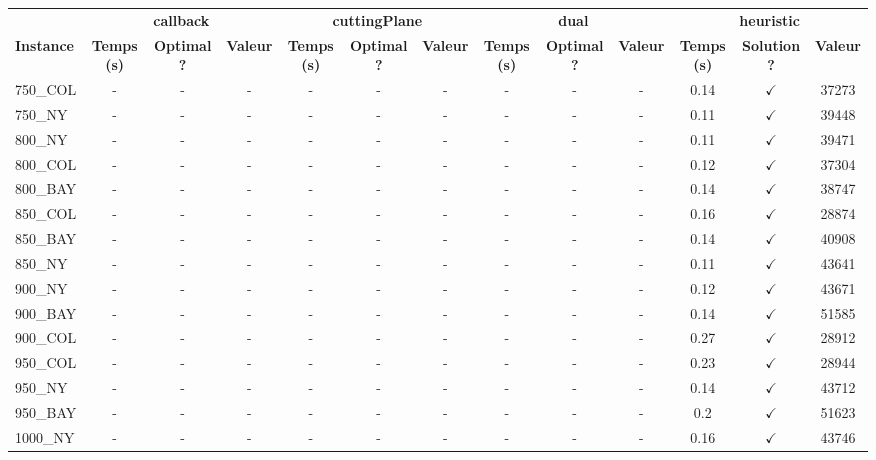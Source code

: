 \documentclass[main.tex]{subfiles}
\begin{document}
\begin{landscape}
\begin{center}
\renewcommand{\arraystretch}{1.4} 
 \begin{tabular}{lcccccccccccc}
	\hline
 & \multicolumn{3}{c}{\textbf{callback}} & \multicolumn{3}{c}{\textbf{cuttingPlane}} & \multicolumn{3}{c}{\textbf{dual}} & \multicolumn{3}{c}{\textbf{heuristic}}\\
\textbf{Instance}  & \textbf{Temps (s)} & \textbf{Optimal ?} & \textbf{Valeur} & \textbf{Temps (s)} & \textbf{Optimal ?} & \textbf{Valeur} & \textbf{Temps (s)} & \textbf{Optimal ?} & \textbf{Valeur} & \textbf{Temps (s)} & \textbf{Solution ?} & \textbf{Valeur}\\\hline

750\_COL & - & - & - 
 & - & - & - 
 & - & - & - 
 & 0.14 & $\checkmark$ & 37273\\
750\_NY & - & - & - 
 & - & - & - 
 & - & - & - 
 & 0.11 & $\checkmark$ & 39448\\
800\_NY & - & - & - 
 & - & - & - 
 & - & - & - 
 & 0.11 & $\checkmark$ & 39471\\
800\_COL & - & - & - 
 & - & - & - 
 & - & - & - 
 & 0.12 & $\checkmark$ & 37304\\
800\_BAY & - & - & - 
 & - & - & - 
 & - & - & - 
 & 0.14 & $\checkmark$ & 38747\\
850\_COL & - & - & - 
 & - & - & - 
 & - & - & - 
 & 0.16 & $\checkmark$ & 28874\\
850\_BAY & - & - & - 
 & - & - & - 
 & - & - & - 
 & 0.14 & $\checkmark$ & 40908\\
850\_NY & - & - & - 
 & - & - & - 
 & - & - & - 
 & 0.11 & $\checkmark$ & 43641\\
900\_NY & - & - & - 
 & - & - & - 
 & - & - & - 
 & 0.12 & $\checkmark$ & 43671\\
900\_BAY & - & - & - 
 & - & - & - 
 & - & - & - 
 & 0.14 & $\checkmark$ & 51585\\
900\_COL & - & - & - 
 & - & - & - 
 & - & - & - 
 & 0.27 & $\checkmark$ & 28912\\
950\_COL & - & - & - 
 & - & - & - 
 & - & - & - 
 & 0.23 & $\checkmark$ & 28944\\
950\_NY & - & - & - 
 & - & - & - 
 & - & - & - 
 & 0.14 & $\checkmark$ & 43712\\
950\_BAY & - & - & - 
 & - & - & - 
 & - & - & - 
 & 0.2 & $\checkmark$ & 51623\\
1000\_NY & - & - & - 
 & - & - & - 
 & - & - & - 
 & 0.16 & $\checkmark$ & 43746\\

\end{tabular}
\end{center}
\end{landscape}
\end{document}
